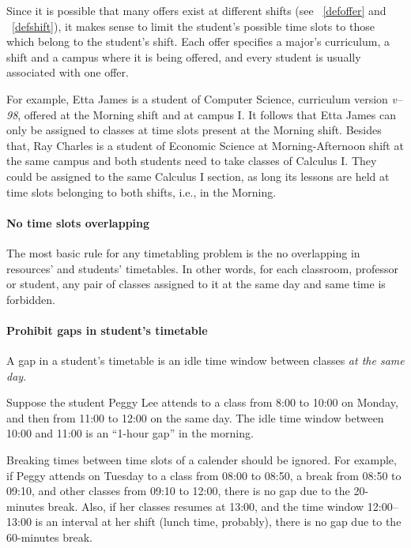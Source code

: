 Since it is possible that many offers exist at different shifts (see ~\ref{defoffer} and ~\ref{defshift}), it makes sense to limit the student's possible time slots to those which belong to the student's shift. Each offer specifies a major's curriculum, a shift and a campus where it is being offered, and every student is usually associated with one offer.

For example, Etta James is a student of Computer Science, curriculum version \textit{v--98}, offered at the Morning shift and at campus I. It follows that Etta James can only be assigned to classes at time slots present at the Morning shift. Besides that, Ray Charles is a student of Economic Science at Morning-Afternoon shift at the same campus and both students need to take classes of Calculus I. They could be assigned to the same Calculus I section, as long its lessons are held at time slots belonging to both shifts, i.e., in the Morning.


\paragraph{No time slots overlapping}
\label{constroverlap}

The most basic rule for any timetabling problem is the no overlapping in resources' and students' timetables. In other words, for each classroom, professor or student, any pair of classes assigned to it at the same day and same time is forbidden.


\paragraph{Prohibit gaps in student's timetable}
\label{constrmingapstudent}

A gap in a student's timetable is an idle time window between classes \textit{at the same day}.

Suppose the student Peggy Lee attends to a class from 8:00 to 10:00 on Monday, and then from 11:00 to 12:00 on the same day. The idle time window between 10:00 and 11:00 is an ``1-hour gap'' in the morning.

Breaking times between time slots of a calender should be ignored. For example, if Peggy attends on Tuesday to a class from 08:00 to 08:50, a break from 08:50 to 09:10, and other classes from 09:10 to 12:00, there is no gap due to the 20-minutes break. Also, if her classes resumes at 13:00, and the time window 12:00--13:00 is an interval at her shift (lunch time, probably), there is no gap due to the 60-minutes break.


